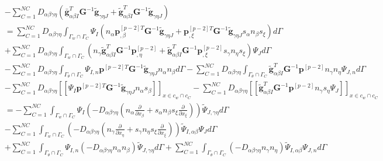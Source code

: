 \begin{equation}
\begin{split}
    &-\sum_{C=1}^{N\!C}D_{\alpha\beta\gamma\eta}(\bar{\pmb g}_{\alpha\beta I}^T\pmb G^{-1}\tilde{\pmb g}_{\gamma\eta J}+\tilde{\pmb g}_{\alpha\beta I}^T\pmb G^{-1}\tilde{\pmb g}_{\gamma\eta J})\\
    &=\sum_{C=1}^{N\!C}D_{\alpha\beta\gamma\eta}\int_{{\Gamma_w}\cap{\Gamma_C}}\Psi_I(n_{\alpha}
    \pmb{p}^{[p-2]T}_{,\beta}\pmb G^{-1}\tilde{\pmb g}_{\gamma\eta J}+\pmb{p}^{[p-2]T}_{,\xi}\pmb G^{-1}\tilde{\pmb g}_{\gamma\eta J}s_{\alpha}n_{\beta}s_{\xi})d\Gamma\\
    &+\sum_{C=1}^{N\!C}D_{\alpha\beta\gamma\eta}\int_{{\Gamma_w}\cap{\Gamma_C}}(n_{\gamma}
    \tilde{\pmb g}_{\alpha\beta I}^T\pmb G^{-1}\pmb{p}^{[p-2]}_{,\eta}+\tilde{\pmb g}_{\alpha\beta I}^T
    \pmb G^{-1}\pmb{p}^{[p-2]}_{,\xi}s_{\gamma}n_{\eta}s_{\xi})\Psi_Jd\Gamma\\
    &-\sum_{C=1}^{N\!C}D_{\alpha\beta\gamma\eta}\int_{{\Gamma_{\theta}}\cap{\Gamma_C}}\Psi_{I,n}
    \pmb{p}^{[p-2]T}\pmb G^{-1}\tilde{\pmb g}_{\gamma\eta J}n_{\alpha}n_{\beta}d\Gamma
    -\sum_{C=1}^{N\!C}D_{\alpha\beta\gamma\eta}\int_{{\Gamma_{\theta}}\cap{\Gamma_C}}
    \tilde{\pmb g}_{\alpha\beta I}^T\pmb G^{-1}\pmb{p}^{[p-2]}n_{\gamma}n_{\eta}\Psi_{J,n}d\Gamma\\
    &-\sum_{C=1}^{N\!C}D_{\alpha\beta\gamma\eta}[[\Psi_I\pmb{p}^{[p-2]T}\pmb G^{-1}\tilde{\pmb g}_{\gamma\eta J}n_{\alpha}s_{\beta}]]_{x\in{c_w}\cap{c_C}}
    -\sum_{C=1}^{N\!C}D_{\alpha\beta\gamma\eta}[[\tilde{\pmb g}_{\alpha\beta I}^T\pmb G^{-1}\pmb{p}^{[p-2]}n_{\gamma}s_{\eta}\Psi_J]]_{x\in{c_w}\cap{c_C}}\\
    &=-\sum_{C=1}^{N\!C}\int_{{\Gamma_w}\cap{\Gamma_C}}\Psi_I(-D_{\alpha\beta\gamma\eta}(n_{\alpha}\frac{\partial}{\partial x_{\beta}}+s_{\alpha}n_{\beta}s_{\xi}\frac{\partial}{\partial x_{\xi}}))\tilde{\Psi}_{J,\gamma\eta}d\Gamma\\
    &-\sum_{C=1}^{N\!C}\int_{{\Gamma_w}\cap{\Gamma_C}}(-D_{\alpha\beta\gamma\eta}(n_{\gamma}\frac{\partial}{\partial x_{\eta}}+s_{\gamma}n_{\eta}s_{\xi}\frac{\partial}{\partial x_{\xi}}))\tilde{\Psi}_{I,\alpha\beta}\Psi_Jd\Gamma\\
    &+\sum_{C=1}^{N\!C}\int_{{\Gamma_{\theta}}\cap{\Gamma_C}}\Psi_{I,n}(-D_{\alpha\beta\gamma\eta}n_{\alpha}n_{\beta})\tilde{\Psi}_{J,\gamma\eta}d\Gamma
    +\sum_{C=1}^{N\!C}\int_{{\Gamma_{\theta}}\cap{\Gamma_C}}(-D_{\alpha\beta\gamma\eta}n_{\gamma}n_{\eta})\tilde{\Psi}_{I,\alpha\beta}\Psi_{J,n}d\Gamma\\

\end{split}
\end{equation}
